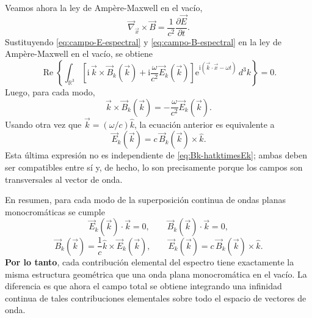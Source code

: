 \documentclass[12pt,a4paper]{article}
\theoremstyle{definition}
\theoremstyle{plain}
\numberwithin{equation}{section}
\theoremstyle{remark}
\newcommand{\ii}{\mathrm{i}}
\newcommand{\ee}{\mathrm{e}}
\begin{document}
Veamos ahora la ley de Ampère-Maxwell en el vacío,
\begin{equation*}
    \vec\nabla_{\vec x}\times \vec B=\frac{1}{c^2}\frac{\partial \vec E}{\partial t}.
\end{equation*}
Sustituyendo \eqref{eq:campo-E-espectral} y \eqref{eq:campo-B-espectral} en la ley de Ampère-Maxwell en el vacío, se obtiene
\begin{equation*}
    \operatorname{Re}\left\{
        \int_{\mathbb R^3}\left[\ii\,\vec k\times\vec B_k(\vec k)+\ii\frac{\omega}{c^2}\vec E_k(\vec k)\right]\ee^{\ii(\vec k\cdot\vec x-\omega t)}\,d^3k
    \right\}=0.
\end{equation*}
Luego, para cada modo,
\begin{equation*}
    \vec k\times\vec B_k(\vec k)=-\frac{\omega}{c^2}\vec E_k(\vec k).
\end{equation*}
Usando otra vez que $\vec k=(\omega/c)\hat k$, la ecuación anterior es equivalente a
\begin{equation*}
    \vec E_k(\vec k)=c\,\vec B_k(\vec k)\times\hat k.
\end{equation*}
Esta última expresión no es independiente de \eqref{eq:Bk-hatktimesEk}; ambas deben ser compatibles entre sí y, de hecho, lo son precisamente porque los campos son transversales al vector de onda.

En resumen, para cada modo de la superposición continua de ondas planas monocromáticas se cumple
\begin{equation*}
    \vec E_k(\vec k)\cdot\vec k=0,
    \qquad
    \vec B_k(\vec k)\cdot\vec k=0,
\end{equation*}
\begin{equation*}
    \vec B_k(\vec k)=\frac{1}{c}\hat k\times \vec E_k(\vec k),
    \qquad
    \vec E_k(\vec k)=c\,\vec B_k(\vec k)\times\hat k.
\end{equation*}
\textbf{Por lo tanto}, cada contribución elemental del espectro tiene exactamente la misma estructura geométrica que una onda plana monocromática en el vacío. La diferencia es que ahora el campo total se obtiene integrando una infinidad continua de tales contribuciones elementales sobre todo el espacio de vectores de onda.
\end{document}

